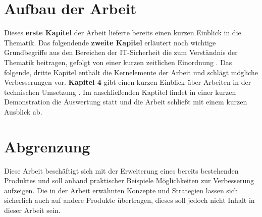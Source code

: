
\section{Aufbau der Arbeit}


Dieses \textbf{erste Kapitel} der Arbeit lieferte bereits einen kurzen Einblick in die Thematik. Das folgendende \textbf{zweite Kapitel} erläutert noch wichtige Grundbegriffe aus den Bereichen der IT-Sicherheit die zum Verständnis der Thematik beitragen, gefolgt von einer kurzen zeitlichen Einordnung  . Das folgende, dritte Kapitel enthält die Kernelemente der Arbeit und schlägt mögliche Verbesserungen vor. \textbf{Kapitel 4} gibt einen kurzen Einblick über Arbeiten in der technischen Umsetzung . Im anschließenden Kaptitel findet in einer kurzen Demonstration die Auswertung statt und die Arbeit schließt mit einem kurzen Ausblick ab.

\section{Abgrenzung}

Diese Arbeit beschäftigt sich mit der Erweiterung eines bereits bestehenden Produktes und soll anhand praktischer Beispiele Möglichkeiten zur Verbesserung aufzeigen. Die in der Arbeit erwähnten Konzepte und Strategien lassen sich sicherlich auch auf andere Produkte übertragen, dieses soll jedoch nicht Inhalt in dieser Arbeit sein.
